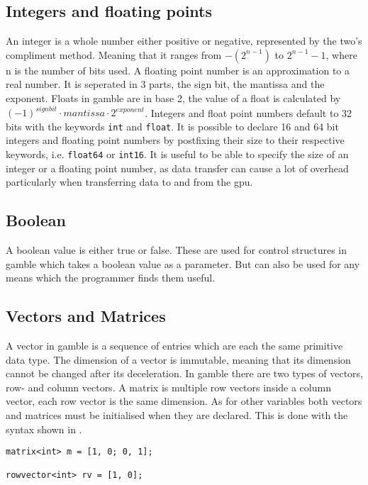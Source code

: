 \subsection*{Integers and floating points}
An integer is a whole number either positive or negative, represented by the two's compliment method. 
Meaning that it ranges from $-(2^{n-1}) $ to $2^{n-1} - 1 $, where n is the number of bits used.
A floating point number is an approximation to a real number. 
It is seperated in 3 parts, the sign bit, the mantissa and the exponent. 
Floats in \gls{gamble} are in base 2, the value of a float is calculated by $ (-1)^{sign bit} \cdot mantissa \cdot 2^{exponent} $. 
Integers and float point numbers default to 32 bits with the keywords \texttt{int} and \texttt{float}. 
It is possible to declare 16 and 64 bit integers and floating point numbers by postfixing their size to their respective keywords, i.e. \texttt{float64} or \texttt{int16}. 
It is useful to be able to specify the size of an integer or a floating point number, as data transfer can cause a lot of overhead particularly when transferring data to and from the \acrshort{gpu}. 

\subsection*{Boolean}
A boolean value is either true or false. 
These are used for control structures in \gls{gamble} which takes a boolean value as a parameter. 
But can also be used for any means which the programmer finds them useful. 

\subsection*{Vectors and Matrices}
A vector in \gls{gamble} is a sequence of entries which are each the same primitive data type. 
The dimension of a vector is immutable, meaning that its dimension cannot be changed after its deceleration. 
In \gls{gamble} there are two types of vectors, row- and column vectors. 
A matrix is multiple row vectors inside a column vector, each row vector is the same dimension. 
As for other variables both vectors and matrices must be initialised when they are declared. 
This is done with the syntax shown in .

\begin{lstlisting}[caption={Creating a matrix},label={lst:matrix}]
matrix<int> m = [1, 0; 0, 1];

rowvector<int> rv = [1, 0];
\end{lstlisting}

